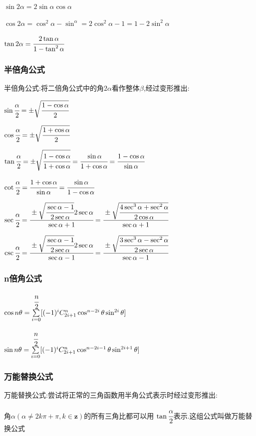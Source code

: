 \documentclass[UTF8,12pt]{ctexbook}
\newcommand{\mathCombination}[2]{C_{#1}^{#2}}
\newcommand{\upDownSum}[2]{\sum\limits_{#2}^{#1}}
\begin{document}
{{{{    $\sin2\alpha = 2\sin\alpha\cos\alpha$

    $\cos2\alpha = \cos^2\alpha - \sin^\alpha = 2\cos^2\alpha - 1 = 1 - 2\sin^2\alpha$

    $\tan2\alpha = \cfrac{2\tan\alpha}{1 - \tan^2\alpha}$
  }%

  \subsubsection{半倍角公式}{
    半倍角公式:将二倍角公式中的角$2\alpha$看作整体$\beta$,经过变形推出:

    $\sin\cfrac{\alpha}{2} = \pm\sqrt{\cfrac{1 - \cos\alpha}{2}}$

    $\cos\cfrac{\alpha}{2} = \pm\sqrt{\cfrac{1 + \cos\alpha}{2}}$

    $\tan\cfrac{\alpha}{2} = \pm\sqrt{\cfrac{1-\cos\alpha}{1+\cos\alpha}} = \cfrac{\sin\alpha}{1+\cos\alpha} = \cfrac{1-\cos\alpha}{\sin\alpha}$

    $\cot\cfrac{\alpha}{2} = \cfrac{1+\cos\alpha}{\sin\alpha} = \cfrac{\sin\alpha}{1-\cos\alpha}$

    $\sec\cfrac{\alpha}{2} = \cfrac{\pm\sqrt{\cfrac{\sec\alpha - 1}{2\sec\alpha}}2\sec\alpha}{\sec\alpha + 1} = \cfrac{\pm\sqrt{\cfrac{4\sec^3\alpha + \sec^2\alpha}{2\cos\alpha}}}{\sec\alpha + 1}$

    $\csc\cfrac{\alpha}{2} = \cfrac{\pm\sqrt{\cfrac{\sec\alpha - 1}{2\sec\alpha}}2\sec\alpha}{\sec\alpha - 1} = \cfrac{\pm\sqrt{\cfrac{3\sec^3\alpha - \sec^2\alpha}{2\sec\alpha}}}{\sec\alpha - 1}$
  }%

  \subsubsection{n倍角公式}{
    $\cos{n\theta} = \upDownSum{\cfrac{n}{2}}{i = 0}[(-1)^i\mathCombination{2i + 1}{n}\cos^{n - 2i}\theta\sin^{2i}\theta]$

    $\sin{n\theta} = \upDownSum{\cfrac{n}{2}}{i = 0}[(-1)^i\mathCombination{2i + 1}{n}\cos^{n - 2i - 1}\theta\sin^{2i+1}\theta]$
  }%

  \subsubsection{万能替换公式}{
    万能替换公式:尝试将正常的三角函数用半角公式表示时经过变形推出:

    角$\alpha(\alpha \neq 2k\pi + \pi ,k \in \mathbf{z})$的所有三角比都可以用 $\tan\cfrac{\alpha}{2}$表示.这组公式叫做万能替换公式

}}}}
\end{document}
